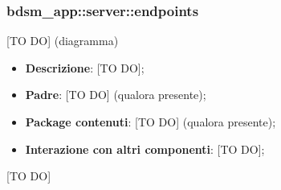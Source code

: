 	  	  \subsubsection{bdsm\_app::server::endpoints} %
  \label{ssub:bdsm_app_server_endpoints}
  [TO DO] (diagramma) \newline \newline

  \begin{itemize}
    \item \textbf{Descrizione}: [TO DO];
    \item \textbf{Padre}: [TO DO] (qualora presente);
    \item \textbf{Package contenuti}: [TO DO] (qualora presente);
    \item \textbf{Interazione con altri componenti}: [TO DO];
  \end{itemize}
[TO DO]
